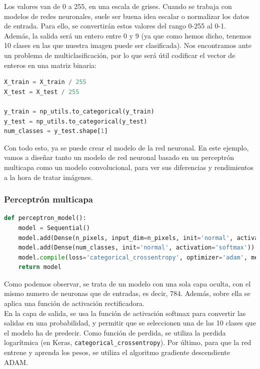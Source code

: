 Los valores van de 0 a 255, en una escala de grises. Cuando se trabaja con modelos de redes neuronales, suele ser buena idea escalar o normalizar los datos de entrada. Para ello, se convertirán estos valores del rango 0-255 al 0-1.\\
Además, la salida será un entero entre 0 y 9 (ya que como hemos dicho, tenemos 10 clases en las que nuestra imagen puede ser clasificada). Nos encontramos ante un problema de multiclasificación, por lo que será útil codificar el vector de enteros en una matriz binaria:
\begin{lstlisting}[language=Python]
X_train = X_train / 255
X_test = X_test / 255

y_train = np_utils.to_categorical(y_train)
y_test = np_utils.to_categorical(y_test)
num_classes = y_test.shape[1]
\end{lstlisting}

Con todo esto, ya se puede crear el modelo de la red neuronal. En este ejemplo, vamos a diseñar tanto un modelo de red neuronal basado en un perceptrón multicapa como un modelo convolucional, para ver sus diferencias y rendimientos a la hora de tratar imágenes.\\
\subsubsection{Perceptrón multicapa}
\begin{lstlisting}[language=Python]
def perceptron_model():
	model = Sequential()
	model.add(Dense(n_pixels, input_dim=n_pixels, init='normal', activation='relu'))
	model.add(Dense(num_classes, init='normal', activation='softmax'))
	model.compile(loss='categorical_crossentropy', optimizer='adam', metrics=['accuracy'])
	return model
\end{lstlisting}
Como podemos observar, se trata de un modelo con una sola capa oculta, con el mismo numero de neuronas que de entradas, es decir, 784. Además, sobre ella se aplica una función de activación rectificadora.\\
En la capa de salida, se usa la función de activación softmax para convertir las salidas en una probabilidad, y permitir que se seleccionen una de las 10 clases que el modelo ha de predecir. Como función de perdida, se utiliza la perdida logarítmica (en Keras, \lstinline{categorical_crossentropy}). Por último, para que la red entrene y aprenda los pesos, se utiliza el algoritmo gradiente descendiente ADAM.\\
